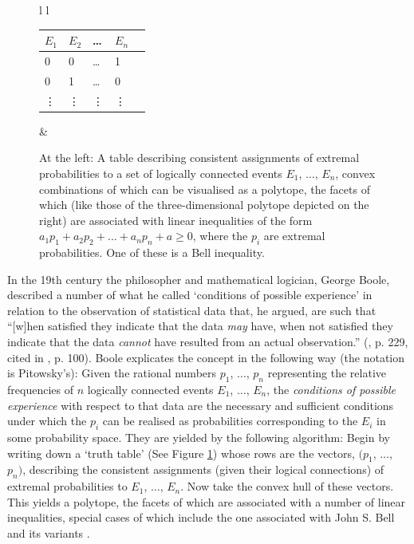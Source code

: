 \documentclass[12pt,english,twoside]{article}
\numberwithin{equation}{section}
\begin{document}
\begin{figure}
  \begin{center}
    \begin{tabular}{l l}
      \begin{tabular}{l | l | l | l | l}
        $E_1$ & $E_2$ & \dots   & $E_n$ \\ \hline
        0   & 0  & \dots   & 1 \\ \hline
        0   & 1  & \dots   & 0 \\ \hline
        \vdots & \vdots & \vdots & \vdots
      \end{tabular}
      &
      \qquad\qquad
    \end{tabular}
  \end{center}
  \caption{At the left: A table describing consistent assignments of extremal probabilities to a set of logically connected events $E_1$, $\dots$, $E_n$, convex combinations of which can be visualised as a polytope, the facets of which (like those of the three-dimensional polytope depicted on the right) are associated with linear inequalities of the form $a_1p_1 + a_2p_2 + \dots + a_np_n + a \geq 0$, where the $p_i$ are extremal probabilities. One of these is a Bell inequality.}
  \label{fig:algorithm}
\end{figure}

In the 19th century the philosopher and mathematical logician, George Boole, described a number of what he called `conditions of possible experience' in relation to the observation of statistical data that, he argued, are such that ``[w]hen satisfied they indicate that the data \emph{may} have, when not satisfied they indicate that the data \emph{cannot} have resulted from an actual observation.'' (\citealt{boole1862}, p. 229, cited in \citealt{pitowsky1994}, p. 100). Boole explicates the concept in the following way (the notation is Pitowsky's): Given the rational numbers $p_1$, $\dots$, $p_n$ representing the relative frequencies of $n$ logically connected events $E_1$, $\dots$, $E_n$, the \emph{conditions of possible experience} with respect to that data are the necessary and sufficient conditions under which the $p_i$ can be realised as probabilities corresponding to the $E_i$ in some probability space. They are yielded by the following algorithm: Begin by writing down a `truth table' (See Figure \ref{fig:algorithm}) whose rows are the vectors, $(p_1$, $\dots$, $p_n)$, describing the consistent assignments (given their logical connections) of extremal probabilities to $E_1$, $\dots$, $E_n$. Now take the convex hull of these vectors. This yields a polytope, the facets of which are associated with a number of linear inequalities, special cases of which include the one associated with John S. Bell and its variants \citep[pp. 103--104]{pitowsky1994}.
\end{document}
